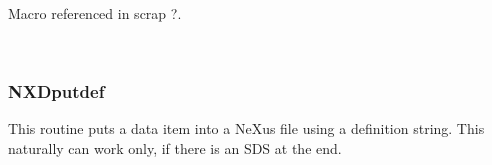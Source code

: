 \documentclass[12pt]{article}
\begin{document}
{\begin{flushleft}
\begin{minipage}{\linewidth}
\begin{list}{}{}
\mbox{}\verb@     DeleteDynString(pReplaced);@\\
\mbox{}\verb@     return iRet;@\\
\mbox{}\verb@   }@\\
\mbox{}\verb@@$\diamond$
\end{list}
\vspace{-1ex}
\footnotesize\addtolength{\baselineskip}{-1ex}
\begin{list}{}{\setlength{\itemsep}{-\parsep}\setlength{\itemindent}{-\leftmargin}}
\item Macro referenced in scrap ?.
\end{list}
\end{minipage}\\[4ex]
\end{flushleft}
\subsubsection{NXDputdef}
This routine puts a data item into a NeXus file using a definition string.
This naturally can work only, if there is an SDS at the end.

}
\end{document}
